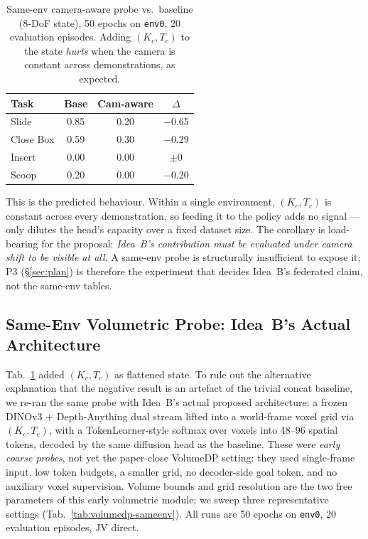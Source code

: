 \documentclass{article}
\begin{document}
\begin{table}[h]
\centering
\footnotesize
\caption{Same-env camera-aware probe vs.\ baseline (8-DoF state),
50 epochs on \texttt{env0}, 20 evaluation episodes. Adding
$(K_c, T_c)$ to the state \emph{hurts} when the camera is
constant across demonstrations, as expected.}
\label{tab:camaware-sameenv}
\begin{tabular}{lccc}
\toprule
Task & Base & Cam-aware & $\Delta$\\
\midrule
Slide      & 0.85 & 0.20           & $-$0.65\\
Close Box  & 0.59 & 0.30           & $-$0.29\\
Insert     & 0.00 & 0.00           & $\pm$0\\
Scoop      & 0.20 & 0.00           & $-$0.20\\
\bottomrule
\end{tabular}
\end{table}

\noindent This is the predicted behaviour. Within a single
environment, $(K_c, T_c)$ is constant across every demonstration,
so feeding it to the policy adds no signal --- only dilutes the
head's capacity over a fixed dataset size. The corollary is
load-bearing for the proposal: \emph{Idea~B's contribution must
be evaluated under camera shift to be visible at all}. A same-env
probe is structurally insufficient to expose it; P3
(\S\ref{sec:plan}) is therefore the experiment that decides
Idea~B's federated claim, not the same-env tables.

\subsection{Same-Env Volumetric Probe: Idea~B's Actual Architecture}
\label{sec:sameenv-volumetric}

Tab.~\ref{tab:camaware-sameenv} added $(K_c, T_c)$ as flattened
state. To rule out the alternative explanation that the negative
result is an artefact of the trivial concat baseline, we re-ran the
same probe with Idea~B's actual proposed architecture: a frozen
DINOv3 + Depth-Anything dual stream lifted into a world-frame
voxel grid via $(K_c, T_c)$, with a TokenLearner-style softmax over
voxels into 48--96 spatial tokens, decoded by the same diffusion
head as the baseline. These were \emph{early coarse probes}, not
yet the paper-close VolumeDP setting: they used single-frame
input, low token budgets, a smaller grid, no decoder-side goal
token, and no auxiliary voxel supervision. Volume bounds and grid
resolution are the two free parameters of this early volumetric
module; we sweep three representative settings
(Tab.~\ref{tab:volumedp-sameenv}). All runs are 50 epochs on
\texttt{env0}, 20 evaluation episodes, JV direct.
\end{document}
